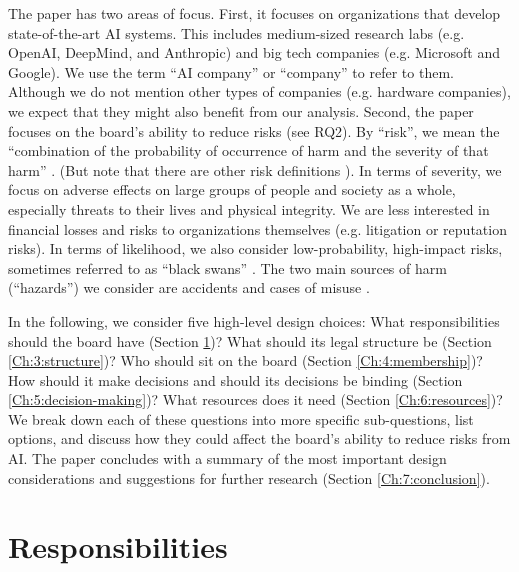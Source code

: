 \documentclass{article}
\begin{document}
The paper has two areas of focus. First, it focuses on organizations that develop state-of-the-art AI systems. This includes medium-sized research labs (e.g. OpenAI, DeepMind, and Anthropic) and big tech companies (e.g. Microsoft and Google). We use the term “AI company” or “company” to refer to them. 
Although we do not mention other types of companies (e.g. hardware companies), we expect that they might also benefit from our analysis. Second, the paper focuses on the board’s ability to reduce risks (see RQ2). By “risk”, we mean the “combination of the probability of occurrence of harm and the severity of that harm” \cite{iso51_2014}. (But note that there are other risk definitions \cite{iso31000_2018}). In terms of severity, we focus on adverse effects on large groups of people and society as a whole, especially threats to their lives and physical integrity. We are less interested in financial losses and risks to organizations themselves (e.g. litigation or reputation risks). In terms of likelihood, we also consider low-probability, high-impact risks, sometimes referred to as “black swans” \cite{taleb2007black, aven2013meaning, kolt2023algorithmic}. The two main sources of harm (“hazards”) we consider are accidents \cite{amodei2016concrete, arnold2021aiaccidents} and cases of misuse \cite{brundage2018malicious, goldstein2023generative, anderljung2023protecting}.

In the following, we consider five high-level design choices: What responsibilities should the board have (Section \ref{Ch:2:responsibilities})? What should its legal structure be (Section \ref{Ch:3:structure})? Who should sit on the board (Section \ref{Ch:4:membership})? How should it make decisions and should its decisions be binding (Section \ref{Ch:5:decision-making})? What resources does it need (Section \ref{Ch:6:resources})? We break down each of these questions into more specific sub-questions, list options, and discuss how they could affect the board’s ability to reduce risks from AI. The paper concludes with a summary of the most important design considerations and suggestions for further research (Section \ref{Ch:7:conclusion}).

\section{Responsibilities}\label{Ch:2:responsibilities}
\end{document}
